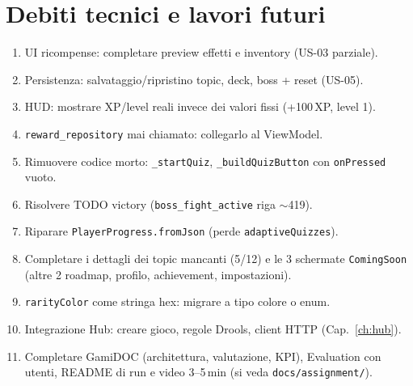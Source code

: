 \chapter{Debiti tecnici e lavori futuri}
\label{ch:debiti}

\begin{enumerate}
\item UI ricompense: completare preview effetti e inventory (US-03 parziale).
\item Persistenza: salvataggio/ripristino topic, deck, boss + reset (US-05).
\item HUD: mostrare XP/level reali invece dei valori fissi (+100\,XP, level 1).
\item \texttt{reward\_repository} mai chiamato: collegarlo al ViewModel.
\item Rimuovere codice morto: \texttt{\_startQuiz}, \texttt{\_buildQuizButton}
con \texttt{onPressed} vuoto.
\item Risolvere TODO victory (\texttt{boss\_fight\_active} riga $\sim$419).
\item Riparare \texttt{PlayerProgress.fromJson} (perde \texttt{adaptiveQuizzes}).
\item Completare i dettagli dei topic mancanti (5/12) e le 3 schermate
\texttt{ComingSoon} (altre 2 roadmap, profilo, achievement, impostazioni).
\item \texttt{rarityColor} come stringa hex: migrare a tipo colore o enum.
\item Integrazione Hub: creare gioco, regole Drools, client HTTP
(Cap.~\ref{ch:hub}).
\item Completare GamiDOC (architettura, valutazione, KPI), Evaluation con
utenti, README di run e video 3--5\,min (si veda \texttt{docs/assignment/}).
\end{enumerate}
